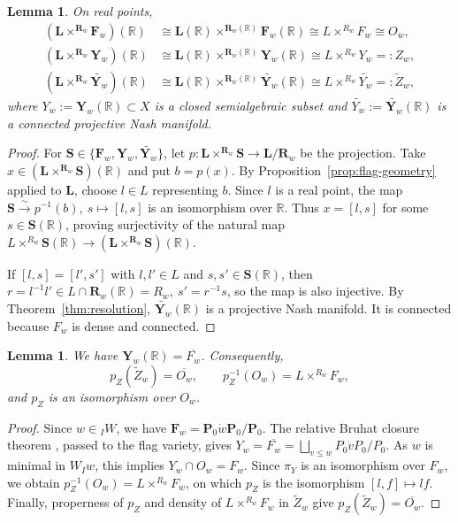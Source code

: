 \documentclass[a4paper,12pt]{amsart}
\numberwithin{equation}{section}
\newtheorem{lemma}[theorem]{Lemma}
\theoremstyle{definition}
\theoremstyle{remark}
\newcommand{\pP}{\mathbf P}
\newcommand{\lL}{\mathbf L}
\newcommand{\Y}{\mathbf Y}
\newcommand{\F}{\mathbf F}
\newcommand{\R}{\mathbb R}
\newcommand{\rR}{\mathbf R}
\begin{document}
\begin{lemma}\label{lem:real-points}
On real points,
\[
\begin{aligned}
 (\lL\times^{\rR_w}\F_w)(\R)&\cong\lL(\R)\times^{\rR_w(\R)}\F_w(\R)\cong L\times^{R_w}F_w\cong O_w,\\
 (\lL\times^{\rR_w}\Y_w)(\R)&\cong\lL(\R)\times^{\rR_w(\R)}\Y_w(\R)\cong L\times^{R_w}Y_w=:Z_w,\\
 (\lL\times^{\rR_w}\widetilde{\Y_w})(\R)&\cong\lL(\R)\times^{\rR_w(\R)}\widetilde{\Y_w}(\R)\cong L\times^{R_w}\widetilde{Y_w}=:\tilde Z_w,
\end{aligned}
\]
where $Y_w:=\Y_w(\R)\subset X$ is a closed semialgebraic subset and $\widetilde{Y_w}:=\widetilde{\Y_w}(\R)$ is a connected projective Nash manifold.
\end{lemma}

\begin{proof}
For $\mathbf S\in\{\F_w,\Y_w,\widetilde{\Y_w}\}$, let
$p:\lL\times^{\rR_w}\mathbf S\longrightarrow\lL/\rR_w$
be the projection. Take $x\in(\lL\times^{\rR_w}\mathbf S)(\R)$ and put $b=p(x)$. By Proposition~\ref{prop:flag-geometry} applied to $\lL$, choose $l\in L$ representing $b$. Since $l$ is a real point, the map
$\mathbf S\xrightarrow{\sim}p^{-1}(b),\ s\longmapsto[l,s]$
is an isomorphism over $\R$. Thus $x=[l,s]$ for some $s\in\mathbf S(\R)$, proving surjectivity of the natural map
$L\times^{R_w}\mathbf S(\R)\longrightarrow(\lL\times^{\rR_w}\mathbf S)(\R)$.

If $[l,s]=[l',s']$ with $l,l'\in L$ and $s,s'\in\mathbf S(\R)$, then
$r=l^{-1}l'\in L\cap\rR_w(\R)=R_w,\ s'=r^{-1}s$,
so the map is also injective.
By Theorem~\ref{thm:resolution}, $\widetilde{\Y_w}(\R)$ is a projective Nash manifold. It is connected because $F_w$ is dense and connected.
\end{proof}
 
\begin{lemma}\label{lem:closure}
We have $\Y_w(\R)=\overline{F_w}$. Consequently,
\begin{equation}\label{eq:pZ-open-preimage}
 p_Z(\tilde Z_w)=\overline{O_w},\qquad p_Z^{-1}(O_w)=L\times^{R_w}F_w,
\end{equation}
and $p_Z$ is an isomorphism over $O_w$.
\end{lemma}

\begin{proof}
Since $w\in{}_IW$, we have $\F_w=\pP_0\dot w\pP_0/\pP_0$. The relative Bruhat closure theorem \cite[Theorem~3.13 and Corollary~3.15]{BT72}, passed to the flag variety, gives $Y_w=\overline{F_w}=\bigsqcup_{v\le w}P_0\dot vP_0/P_0$. 
As $w$ is minimal in $W_Iw$, this implies $Y_w\cap O_w=F_w$. 
Since $\pi_Y$ is an isomorphism over $F_w$, we obtain $p_Z^{-1}(O_w)=L\times^{R_w}F_w$, on which $p_Z$ is the isomorphism $[l,f]\mapsto lf$. Finally, properness of $p_Z$ and density of $L\times^{R_w}F_w$ in $\tilde Z_w$ give $p_Z(\tilde Z_w)=\overline{O_w}$.
\end{proof}
\end{document}
